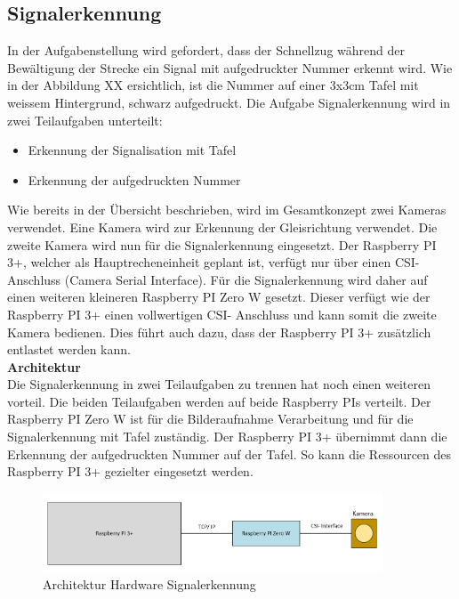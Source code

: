 \documentclass[../../main.tex]{subfiles}
\begin{document}
\subsection{Signalerkennung}
    In der Aufgabenstellung wird gefordert, dass der Schnellzug während der Bewältigung der Strecke ein Signal mit aufgedruckter Nummer erkennt wird. Wie in der Abbildung XX ersichtlich, ist die Nummer auf einer 3x3cm Tafel mit weissem Hintergrund, schwarz aufgedruckt. Die Aufgabe Signalerkennung wird in zwei Teilaufgaben unterteilt:
    \begin{itemize}
        \item Erkennung der Signalisation mit Tafel
        \item Erkennung der aufgedruckten Nummer
    \end{itemize}
    Wie bereits in der Übersicht beschrieben, wird im Gesamtkonzept zwei Kameras verwendet. Eine Kamera wird zur Erkennung der Gleisrichtung verwendet. Die zweite Kamera wird nun für die Signalerkennung eingesetzt. Der Raspberry PI 3+, welcher als Hauptrecheneinheit geplant ist, verfügt nur über einen CSI- Anschluss (Camera Serial Interface). Für die Signalerkennung wird daher auf einen weiteren kleineren Raspberry PI Zero W gesetzt. Dieser verfügt wie der Raspberry PI 3+ einen vollwertigen CSI- Anschluss und kann somit die zweite Kamera bedienen. Dies führt auch dazu, dass der Raspberry PI 3+ zusätzlich entlastet werden kann.\\

    \textbf{Architektur}\\
    Die Signalerkennung in zwei Teilaufgaben zu trennen hat noch einen weiteren vorteil. Die beiden Teilaufgaben werden auf beide Raspberry PIs verteilt. Der Raspberry PI Zero W ist für die Bilderaufnahme Verarbeitung und für die Signalerkennung mit Tafel zuständig. Der Raspberry PI 3+ übernimmt dann die Erkennung der aufgedruckten Nummer auf der Tafel. So kann die Ressourcen des Raspberry PI 3+ gezielter eingesetzt werden.

    \begin{figure}[H] %
        \centering
        \includegraphics[width=0.9\textwidth]{Architektur.png}
        \caption{Architektur Hardware Signalerkennung}
        \label{fig:architektur_hardware_signalerkennung}
    \end{figure}
\end{document}
